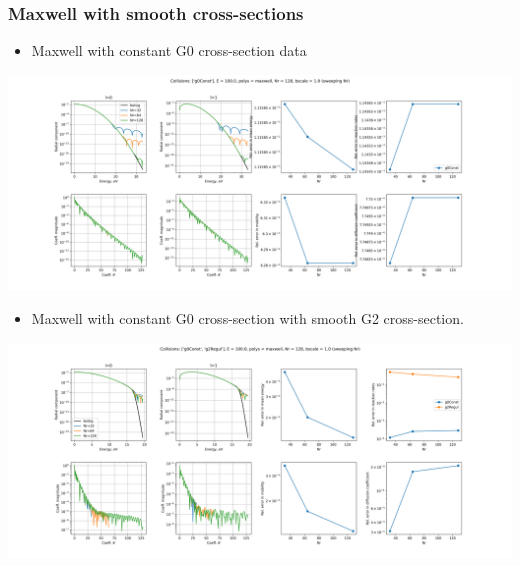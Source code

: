 \documentclass[mathserif, aspectratio=169]{beamer}
\begin{document}
\begin{frame}
	\frametitle{Maxwell with smooth cross-sections}
	\only<+>
	{
		\begin{itemize}
			\item Maxwell with constant G0 cross-section data
		\end{itemize}
		\includegraphics[width=\textwidth]{fig/maxwell_vs_bolsig_g0Const_E100.0_poly_maxwell_nr128_bscale1.0_sweeping_Nr.png}
	}
	\only<+>
	{
		\begin{itemize}
			\item Maxwell with constant G0 cross-section with smooth G2 cross-section. 
		\end{itemize}
		\includegraphics[width=\textwidth]{fig/maxwell_vs_bolsig_g0Const_g2Regul_E100.0_poly_maxwell_nr128_bscale1.0_sweeping_Nr.png}
	}

\end{frame}
\end{document}
